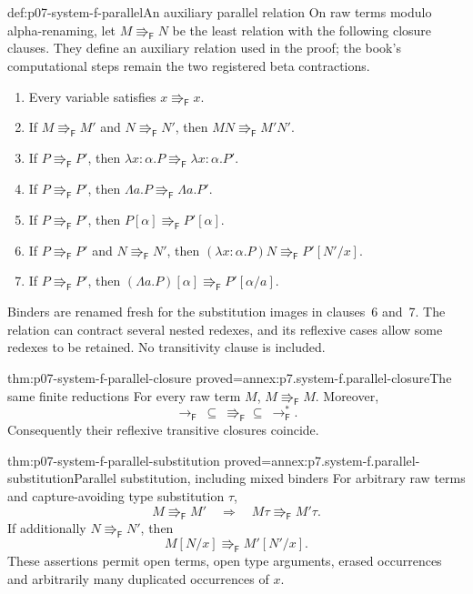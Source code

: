 \begin{hbdefinition}{def:p07-system-f-parallel}{An auxiliary parallel relation}
On raw terms modulo alpha-renaming, let \(M\Rrightarrow_{\mathsf F}N\)
be the least relation with the following closure clauses. They define an
auxiliary relation used in the proof; the book's computational steps remain
the two registered beta contractions.
\begin{enumerate}
\item Every variable satisfies \(x\Rrightarrow_{\mathsf F}x\).
\item If \(M\Rrightarrow_{\mathsf F}M'\) and
      \(N\Rrightarrow_{\mathsf F}N'\), then
      \(MN\Rrightarrow_{\mathsf F}M'N'\).
\item If \(P\Rrightarrow_{\mathsf F}P'\), then
      \(\lambda x{:}\alpha.P\Rrightarrow_{\mathsf F}
        \lambda x{:}\alpha.P'\).
\item If \(P\Rrightarrow_{\mathsf F}P'\), then
      \(\Lambda a.P\Rrightarrow_{\mathsf F}\Lambda a.P'\).
\item If \(P\Rrightarrow_{\mathsf F}P'\), then
      \(P[\alpha]\Rrightarrow_{\mathsf F}P'[\alpha]\).
\item If \(P\Rrightarrow_{\mathsf F}P'\) and
      \(N\Rrightarrow_{\mathsf F}N'\), then
      \((\lambda x{:}\alpha.P)N\Rrightarrow_{\mathsf F}P'[N'/x]\).
\item If \(P\Rrightarrow_{\mathsf F}P'\), then
      \((\Lambda a.P)[\alpha]\Rrightarrow_{\mathsf F}P'[\alpha/a]\).
\end{enumerate}
Binders are renamed fresh for the substitution images in clauses~6 and~7.
The relation can contract several nested redexes, and its reflexive cases
allow some redexes to be retained. No transitivity clause is included.
\end{hbdefinition}

\begin{hblemma}{thm:p07-system-f-parallel-closure}
 {proved=annex:p7.system-f.parallel-closure}{The same finite reductions}
For every raw term \(M\), \(M\Rrightarrow_{\mathsf F}M\). Moreover,
\[
 \to_{\mathsf F}\ \subseteq\ \Rrightarrow_{\mathsf F}
 \subseteq\ \to_{\mathsf F}^*.
\]
Consequently their reflexive transitive closures coincide.
\end{hblemma}

\begin{hblemma}{thm:p07-system-f-parallel-substitution}
 {proved=annex:p7.system-f.parallel-substitution}{Parallel substitution, including mixed binders}
For arbitrary raw terms and capture-avoiding type substitution \(\tau\),
\[
 M\Rrightarrow_{\mathsf F}M'
 \quad\Longrightarrow\quad M\tau\Rrightarrow_{\mathsf F}M'\tau.
\]
If additionally \(N\Rrightarrow_{\mathsf F}N'\), then
\[
 M[N/x]\Rrightarrow_{\mathsf F}M'[N'/x].
\]
These assertions permit open terms, open type arguments, erased
occurrences and arbitrarily many duplicated occurrences of \(x\).
\end{hblemma}

